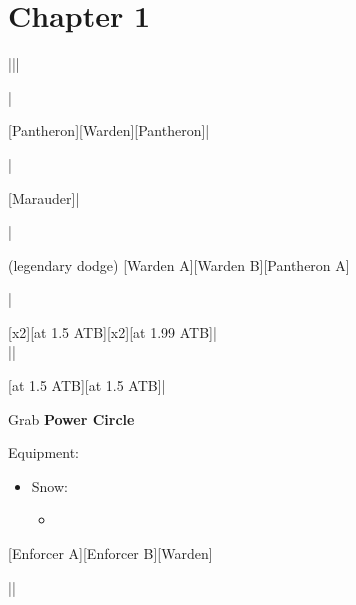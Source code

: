 \section{Chapter 1}

\begin{mainlist}
	\item {}
	\item {}
		|\skip||\skip
	\item \skip|\skip
	\item {}
		[Pantheron]\to{}[Warden]\to{}[Pantheron]|\skip
	\item \skip|\skip
	\item {}
		[Marauder]\to{}|
	\item \skip|\skip
	\item {} (legendary dodge)
		[Warden A]\to{}[Warden B]\to{}[Pantheron A]
	\item \skip|\skip
	\item {}
		\to{}[x2]\to{}[at 1.5 ATB]\to{}[x2]\to{}[at 1.99 ATB]\to{}|\skip\\|\save|\skip
	\item {}
		[at 1.5 ATB]\to{}\to{}\to{}[at 1.5 ATB]\to{}\to{}\to{}|
	\item Grab \textbf{Power Circle}
\end{mainlist}
\begin{menu}
	\item Equipment:
	\begin{itemize}
		\item Snow:
		\begin{itemize}
			\item {}
		\end{itemize}
	\end{itemize}
\end{menu}
\begin{mainlist}
	\item \skip
	\item {}
		[Enforcer A]\to{}[Enforcer B]\to{}[Warden]
	\item {}|\skip|\save
\end{mainlist}
